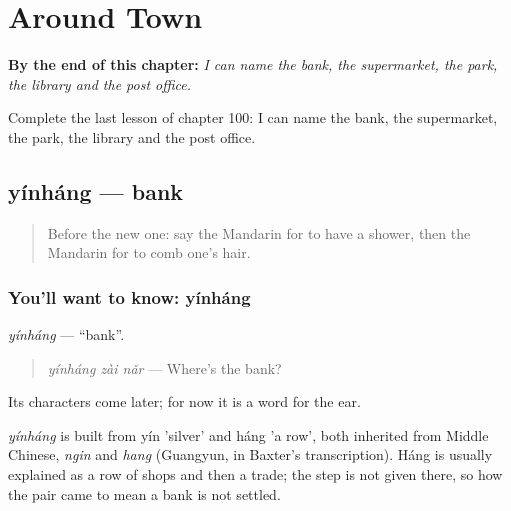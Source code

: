 
\chapter{Around Town}
\label{ch:zh-around-town}

\begin{chapteropening}
\textbf{By the end of this chapter:} \emph{I can name the bank, the supermarket, the park, the library and the post office.}

Complete the last lesson of chapter 100: I can name the bank, the supermarket, the park, the library and the post office.
\end{chapteropening}

\section[yínháng]{yínháng — bank}

\label{lesson:ZH-C100-yinhang}



\begin{quote}
Before the new one: say the Mandarin for to have a shower, then the Mandarin for to comb one's hair.
\end{quote}

\subsection*{You'll want to know: yínháng}
\emph{yínháng} — \textquotedblleft{}bank\textquotedblright{}.

\begin{quote}
\emph{yínháng zài nǎr} — Where's the bank?
\end{quote}

Its characters come later; for now it is a word for the ear.

\begin{cousinweb}
\emph{yínháng} is built from yín 'silver' and háng 'a row', both inherited from Middle Chinese, \emph{ngin} and \emph{hang} (Guangyun, in Baxter's transcription). Háng is usually explained as a row of shops and then a trade; the step is not given there, so how the pair came to mean a bank is not settled.
\end{cousinweb}

